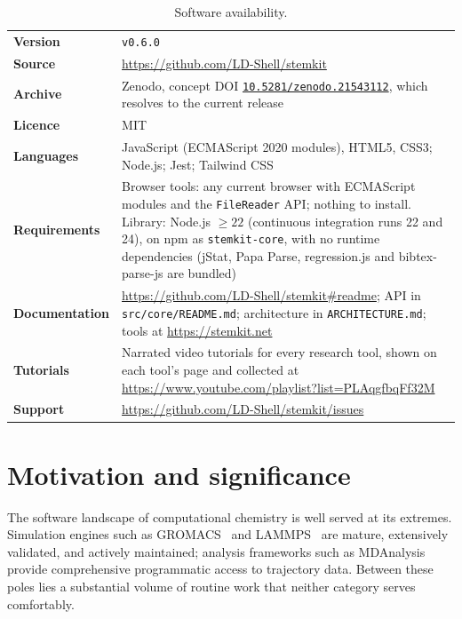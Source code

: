 \documentclass[11pt,a4paper]{article}
\begin{document}
\vspace{0.4em}
\begin{table}[H]
\centering
\caption{Software availability.}
\label{tab:metadata}
\small
\begin{tabular}{@{}>{\sffamily\bfseries\color{stkslate700}}l>{\raggedright\arraybackslash}p{12.2cm}@{}}
\toprule
Version & \texttt{v0.6.0} \\
Source & \url{https://github.com/LD-Shell/stemkit} \\
Archive & Zenodo, concept DOI \href{https://doi.org/10.5281/zenodo.21543112}{\texttt{10.5281/zenodo.21543112}}, which resolves to the current release \\
Licence & MIT \\
Languages & JavaScript (ECMAScript 2020 modules), HTML5, CSS3; Node.js; Jest; Tailwind CSS \\
Requirements & Browser tools: any current browser with ECMAScript modules and the \texttt{FileReader} API; nothing to install. Library: Node.js $\geq 22$ (continuous integration runs 22 and 24), on npm as \texttt{stemkit-core}, with no runtime dependencies (jStat, Papa Parse, regression.js and bibtex-parse-js are bundled) \\
Documentation & \url{https://github.com/LD-Shell/stemkit\#readme}; API in \texttt{src/core/README.md}; architecture in \texttt{ARCHITECTURE.md}; tools at \url{https://stemkit.net} \\
Tutorials & Narrated video tutorials for every research tool, shown on each tool's page and collected at \url{https://www.youtube.com/playlist?list=PLAqgfbqFf32M} \\
Support & \url{https://github.com/LD-Shell/stemkit/issues} \\
\bottomrule
\end{tabular}
\end{table}

\section{Motivation and significance}
\label{sec:motivation}

The software landscape of computational chemistry is well served at its
extremes. Simulation engines such as GROMACS~\cite{abraham2015} and
LAMMPS~\cite{thompson2022} are mature, extensively validated, and actively
maintained; analysis frameworks such as
MDAnalysis~\cite{michaud-agrawal2011mdanalysis} provide comprehensive
programmatic access to trajectory data. Between these poles lies a substantial
volume of routine work that neither category serves comfortably.
\end{document}
